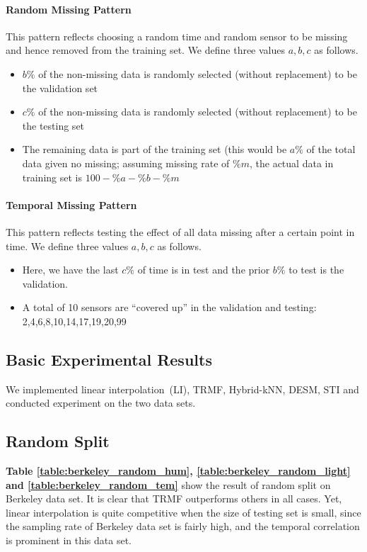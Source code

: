\paragraph*{Random Missing Pattern}

This pattern reflects choosing a random time and random sensor to be missing and hence removed from the training set.
We define three values $a, b, c$ as follows.

\begin{itemize}
\item $b\%$ of the non-missing data is randomly selected (without replacement) to be the validation set
\item $c\%$ of the non-missing data is randomly selected (without replacement) to be the testing set
\item The remaining data is part of the training set (this would be $a\%$ of the total data given no missing; assuming missing rate of $\%m$, the actual data in training set is $100-\%a-\%b-\%m$
\end{itemize}

\paragraph*{Temporal Missing Pattern}

This pattern reflects testing the effect of all data missing after a certain point in time.
We define three values $a, b, c$ as follows.

\begin{itemize}
\item Here, we have the last $c\%$ of time is in test and the prior $b\%$ to test is the validation.
\item A total of 10 sensors are ``covered up'' in the validation and testing: 2,4,6,8,10,14,17,19,20,99
\end{itemize}

\subsection{Basic Experimental Results} %

We implemented linear interpolation~(LI), TRMF, Hybrid-kNN, DESM, STI and conducted experiment on the two data sets.

\subsection{Random Split}
\textbf{Table \ref{table:berkeley_random_hum}, \ref{table:berkeley_random_light} and \ref{table:berkeley_random_tem}} show the result of random split on Berkeley data set. It is clear that TRMF outperforms others in all cases. Yet, linear interpolation is quite competitive when the size of testing set is small, since the sampling rate of Berkeley data set is fairly high, and the temporal correlation is prominent in this data set.  

